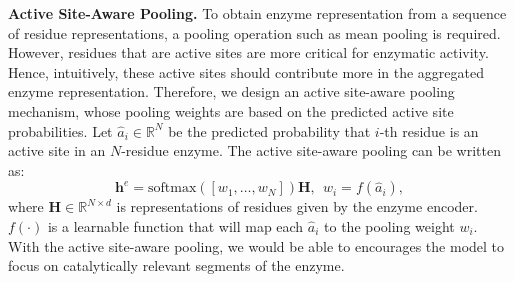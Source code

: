 \textbf{Active Site-Aware Pooling.} 
To obtain enzyme representation from a sequence of residue representations, a pooling operation such as mean pooling is required. However, residues that are active sites are more critical for enzymatic activity. Hence, intuitively, these active sites should contribute more in the aggregated enzyme representation\cite{dai2022prototypebasedselfexplainablegraphneural}. Therefore, we design an active site-aware pooling mechanism, whose pooling weights are based on the predicted active site probabilities.
Let $\hat{a}_i \in \mathbb{R}^{N}$ be the predicted probability that $i$-th residue is an active site in an \(N\)-residue enzyme. 
The active site-aware pooling can be written as:
\begin{equation}
    \mathbf{h}^e = \mathrm{softmax}([w_1,\dots,w_N]) \mathbf{H}, 
    ~~
    {w}_i = f(\hat{a}_i),
    \label{eq:sitepooling}
\end{equation}
where $\mathbf{H} \in \mathbb{R}^{N\times d}$ is representations of residues given by the enzyme encoder. $f(\cdot)$ is a learnable function that will map each $\hat{a}_i$ to the pooling weight ${w}_i$. With the active site-aware pooling, we would be able to encourages the model to focus on catalytically relevant segments of the enzyme.






